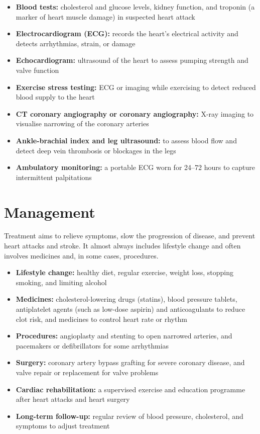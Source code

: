 \begin{itemize}
    \item \textbf{Blood tests:} cholesterol and glucose levels, kidney function, and troponin (a marker of heart muscle damage) in suspected heart attack
    \item \textbf{Electrocardiogram (ECG):} records the heart's electrical activity and detects arrhythmias, strain, or damage
    \item \textbf{Echocardiogram:} ultrasound of the heart to assess pumping strength and valve function
    \item \textbf{Exercise stress testing:} ECG or imaging while exercising to detect reduced blood supply to the heart
    \item \textbf{CT coronary angiography or coronary angiography:} X-ray imaging to visualise narrowing of the coronary arteries
    \item \textbf{Ankle-brachial index and leg ultrasound:} to assess blood flow and detect deep vein thrombosis or blockages in the legs
    \item \textbf{Ambulatory monitoring:} a portable ECG worn for 24--72 hours to capture intermittent palpitations
\end{itemize}

\section*{Management}
Treatment aims to relieve symptoms, slow the progression of disease, and prevent heart attacks and stroke. It almost always includes lifestyle change and often involves medicines and, in some cases, procedures.

\begin{itemize}
    \item \textbf{Lifestyle change:} healthy diet, regular exercise, weight loss, stopping smoking, and limiting alcohol
    \item \textbf{Medicines:} cholesterol-lowering drugs (statins), blood pressure tablets, antiplatelet agents (such as low-dose aspirin) and anticoagulants to reduce clot risk, and medicines to control heart rate or rhythm
    \item \textbf{Procedures:} angioplasty and stenting to open narrowed arteries, and pacemakers or defibrillators for some arrhythmias
    \item \textbf{Surgery:} coronary artery bypass grafting for severe coronary disease, and valve repair or replacement for valve problems
    \item \textbf{Cardiac rehabilitation:} a supervised exercise and education programme after heart attacks and heart surgery
    \item \textbf{Long-term follow-up:} regular review of blood pressure, cholesterol, and symptoms to adjust treatment
\end{itemize}

